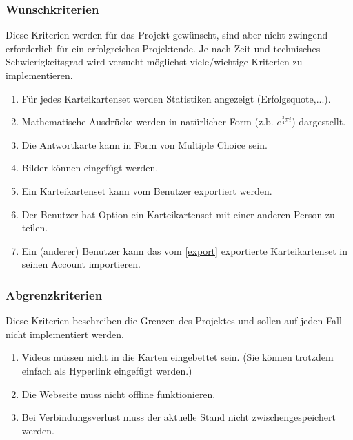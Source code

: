 \subsubsection{Wunschkriterien}
Diese Kriterien werden für das Projekt gewünscht, sind aber nicht zwingend erforderlich für ein erfolgreiches Projektende. Je nach Zeit und technisches Schwierigkeitsgrad wird versucht möglichst viele/wichtige Kriterien zu implementieren.

\begin{enumerate}[leftmargin=2cm, label=\bfseries /WK\arabic*0/]
	\item Für jedes Karteikartenset werden Statistiken angezeigt (Erfolgsquote,...).
	\item Mathematische Ausdrücke werden in natürlicher Form (z.b. \( e^{\frac{3}{4}\pi i}\)) dargestellt.
	\item Die Antwortkarte kann in Form von Multiple Choice sein.
	\item Bilder können eingefügt werden.
	\item\label{export} Ein Karteikartenset kann vom Benutzer exportiert werden.
	\item\label{share} Der Benutzer hat Option ein Karteikartenset mit einer anderen Person zu teilen.
	\item Ein (anderer) Benutzer kann das vom \ref{export} exportierte Karteikartenset in seinen Account importieren.
\end{enumerate}

\subsubsection{Abgrenzkriterien}
Diese Kriterien beschreiben die Grenzen des Projektes und sollen auf jeden Fall nicht implementiert werden.

\begin{enumerate}[leftmargin=2cm, label=\bfseries /AK\arabic*0/]
	\item Videos müssen nicht in die Karten eingebettet sein. (Sie können trotzdem einfach als Hyperlink eingefügt werden.)
	\item Die Webseite muss nicht offline funktionieren.
	\item Bei Verbindungsverlust muss der aktuelle Stand nicht zwischengespeichert werden.
\end{enumerate}



